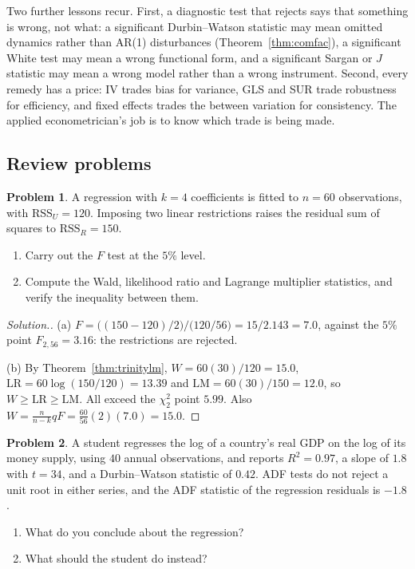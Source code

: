 \documentclass[11pt,a4paper]{article}
\numberwithin{equation}{section}
\theoremstyle{definition}
\newtheorem{problemx}{Problem}[subsection]
\newenvironment{problem}{\begin{problemx}}{\end{problemx}}
\newenvironment{solution}
  {\renewcommand{\qedsymbol}{}\begin{proof}[\textit{Solution}.]}
  {\end{proof}}
\begin{document}
Two further lessons recur. First, a diagnostic test that rejects says that something is wrong, not what: a significant Durbin--Watson statistic may
mean omitted dynamics rather than AR(1) disturbances (Theorem~\ref{thm:comfac}), a significant White test may mean a wrong functional form, and a significant
Sargan or $J$ statistic may mean a wrong model rather than a wrong instrument. Second, every remedy has a price: IV trades bias for variance, GLS and SUR
trade robustness for efficiency, and fixed effects trades the between variation for consistency. The applied econometrician's job is to know which
trade is being made.

\subsection{Review problems}
\label{ssec:review}

\begin{problem}
A regression with $k = 4$ coefficients is fitted to $n = 60$ observations, with $\text{RSS}_U = 120$. Imposing two linear restrictions raises the residual sum of squares
to $\text{RSS}_R = 150$.
\begin{enumerate}[label=(\alph*)]
\item Carry out the $F$ test at the $5\%$ level.
\item Compute the Wald, likelihood ratio and Lagrange multiplier statistics, and verify the inequality between them.
\end{enumerate}
\end{problem}

\begin{solution}
(a) $F = \bigl((150 - 120)/2\bigr)/\bigl(120/56\bigr) = 15/2.143 = 7.0$, against the $5\%$ point $F_{2,56} = 3.16$: the restrictions are rejected.

(b) By Theorem~\ref{thm:trinitylm}, $W = 60(30)/120 = 15.0$, $\text{LR} = 60\log(150/120) = 13.39$ and $\text{LM} = 60(30)/150 = 12.0$, so $W \geq \text{LR} \geq \text{LM}$. All exceed the $\chi^2_2$ point $5.99$. Also
$W = \frac{n}{n-k}qF = \frac{60}{56}(2)(7.0) = 15.0$.
\end{solution}

\begin{problem}
A student regresses the log of a country's real GDP on the log of its money supply, using $40$ annual observations, and reports $R^2 = 0.97$, a slope of $1.8$ with
$t = 34$, and a Durbin--Watson statistic of $0.42$. ADF tests do not reject a unit root in either series, and the ADF statistic of the regression residuals is
$-1.8$.
\begin{enumerate}[label=(\alph*)]
\item What do you conclude about the regression?
\item What should the student do instead?
\end{enumerate}
\end{problem}
\end{document}
